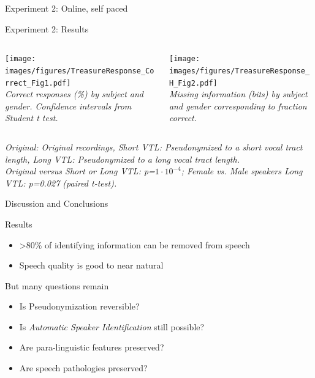 \documentclass[xcolor={dvipsnames}]{beamer}
\begin{document}
\begin{frame}{Experiment 2: Online, self paced}
\let\thefootnote\relax{}
\end{frame}

\begin{frame}{Experiment 2: Results}
    \begin{columns}
        \centering
        \begin{column}{0.48\textwidth}
        \texttt{[image: images/figures/TreasureResponse\_Correct\_Fig1.pdf]} \\
        \scriptsize{\textit{Correct responses (\%) by subject and gender.
        Confidence intervals from Student t test.}}
        \end{column}
        \begin{column}{0.48\textwidth}
        \texttt{[image: images/figures/TreasureResponse\_H\_Fig2.pdf]}\\
        \scriptsize{\textit{Missing information (bits) by subject and gender corresponding to fraction correct.}}

        \end{column}
    \end{columns}
    \vskip 0.8cm
    \scriptsize{\textit{Original: Original recordings, Short VTL: Pseudonymized to a short vocal tract length, Long VTL: Pseudonymized to a long vocal tract length.\\
    Original versus Short or Long VTL: p=$1\cdot 10^{-4}$; Female vs. Male speakers Long VTL: p=0.027 (paired t-test).}}
\end{frame}

\begin{frame}{Discussion and Conclusions}

\begin{block}{Results}
\begin{itemize}
    \item >80\% of identifying information can be removed from speech
    \item Speech quality is good to near natural
\end{itemize}
\end{block}
 \begin{block}{But many questions remain}
\begin{itemize}
    \item Is Pseudonymization reversible?
    \item Is {\em Automatic Speaker Identification} still possible?
    \item Are para-linguistic features preserved?
    \item Are speech pathologies preserved?
\end{itemize}
\end{block}

\end{frame}
\end{document}
